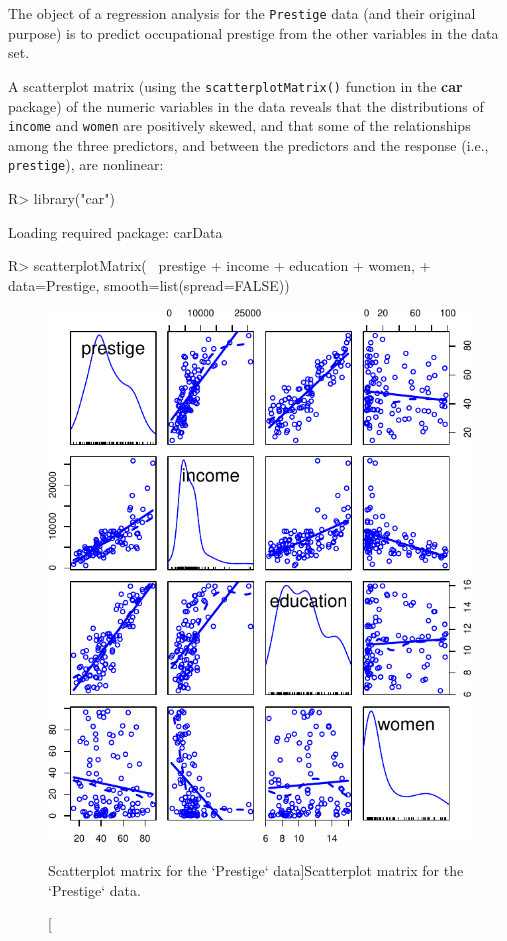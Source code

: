 \documentclass[
]{jss}
\begin{document}
The object of a regression analysis for the \texttt{Prestige} data (and
their original purpose) is to predict occupational prestige from the
other variables in the data set.

A scatterplot matrix (using the \texttt{scatterplotMatrix()} function in
the \textbf{car} package) of the numeric variables in the data reveals
that the distributions of \texttt{income} and \texttt{women} are
positively skewed, and that some of the relationships among the three
predictors, and between the predictors and the response (i.e.,
\texttt{prestige}), are nonlinear:

\begin{CodeChunk}
\begin{CodeInput}
R> library("car")
\end{CodeInput}
\begin{CodeOutput}
Loading required package: carData
\end{CodeOutput}
\begin{CodeInput}
R> scatterplotMatrix(~ prestige + income + education + women,
+                   data=Prestige, smooth=list(spread=FALSE))
\end{CodeInput}
\begin{figure}

{\centering \includegraphics[width=1\linewidth]{JSS-article_files/figure-latex/scatterplot-matrix-1} 

}

\caption[Scatterplot matrix for the `Prestige` data]{Scatterplot matrix for the `Prestige` data.}\label{fig:scatterplot-matrix}
\end{figure}
\end{CodeChunk}
\end{document}
